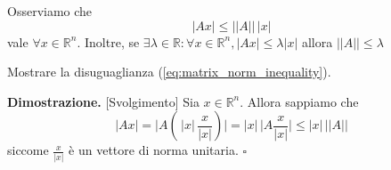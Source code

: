 %
\begin{remark}
    Osserviamo che
    \begin{equation}
    |Ax| \leq || A || \, |x|
    \label{eq:matrix_norm_inequality}
    \end{equation}
    vale $\forall x \in \mathbb{R}^n$. Inoltre, se $\exists \lambda \in \mathbb{R} : \forall x \in \mathbb{R}^n, |Ax| \leq \lambda |x|$ allora $|| A || \leq \lambda$
\end{remark}
%
\vspace{0.5cm}
\begin{exercise}
    Mostrare la disuguaglianza (\ref{eq:matrix_norm_inequality}).
\end{exercise}
%
\noindent \textbf{Dimostrazione. } [Svolgimento]
    Sia $x \in \mathbb{R}^n$. Allora sappiamo che
    \[
    |Ax| = \big|A( \, |x| \, \frac{x}{|x|} )\big| = |x| \, \big|A\frac{x}{|x|}\big| \leq |x| \, || A ||
    \]
    siccome $\frac{x}{|x|}$ è un vettore di norma unitaria.
\hfill $\square$

